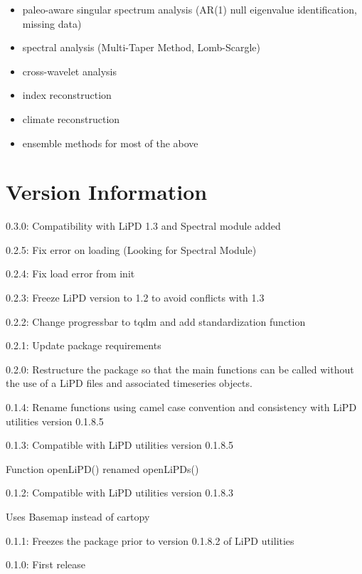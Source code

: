 \documentclass[letterpaper,10pt,english]{sphinxmanual}
\begin{document}
\begin{itemize}
\item {} 
paleo-aware singular spectrum analysis (AR(1) null eigenvalue identification, missing data)

\item {} 
spectral analysis (Multi-Taper Method, Lomb-Scargle)

\item {} 
cross-wavelet analysis

\item {} 
index reconstruction

\item {} 
climate reconstruction

\item {} 
ensemble methods for most of the above

\end{itemize}


\section{Version Information}
\label{\detokenize{Introduction:version-information}}
\begin{DUlineblock}{0em}
\item[] 0.3.0: Compatibility with LiPD 1.3 and Spectral module added
\item[] 0.2.5: Fix error on loading (Looking for Spectral Module)
\item[] 0.2.4: Fix load error from init
\item[] 0.2.3: Freeze LiPD version to 1.2 to avoid conflicts with 1.3
\item[] 0.2.2: Change progressbar to tqdm and add standardization function
\item[] 0.2.1: Update package requirements
\item[] 0.2.0: Restructure the package so that the main functions can be called without the use of a LiPD files and associated timeseries objects.
\item[] 0.1.4: Rename functions using camel case convention and consistency with LiPD utilities version 0.1.8.5
\item[] 0.1.3: Compatible with LiPD utilities version 0.1.8.5
\item[]
\begin{DUlineblock}{\DUlineblockindent}
\item[] Function openLiPD() renamed openLiPDs()
\end{DUlineblock}
\item[] 0.1.2: Compatible with LiPD utilities version 0.1.8.3
\item[]
\begin{DUlineblock}{\DUlineblockindent}
\item[] Uses Basemap instead of cartopy
\end{DUlineblock}
\item[] 0.1.1: Freezes the package prior to version 0.1.8.2 of LiPD utilities
\item[] 0.1.0: First release
\end{DUlineblock}
\end{document}
